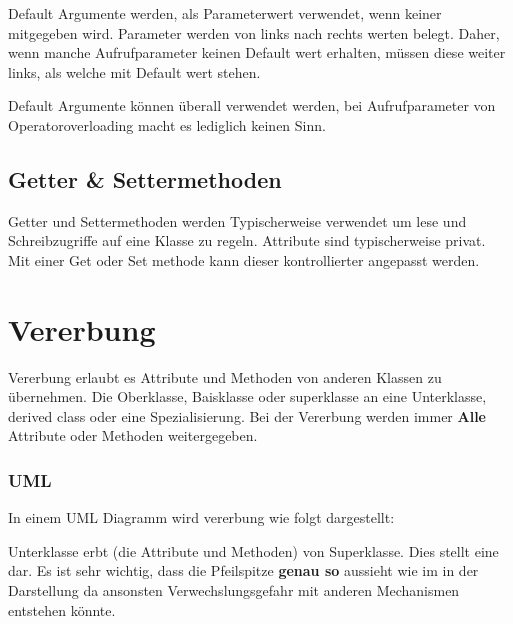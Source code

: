 Default Argumente werden, als Parameterwert verwendet, wenn keiner mitgegeben wird.
Parameter werden von links nach rechts werten belegt. 
Daher, wenn manche Aufrufparameter keinen Default wert erhalten, müssen diese weiter links, als welche mit Default wert stehen.  



Default Argumente können überall verwendet werden, bei Aufrufparameter von Operatoroverloading macht es lediglich keinen Sinn.

\subsection{Getter \& Settermethoden}

Getter und Settermethoden werden Typischerweise verwendet um lese und Schreibzugriffe auf eine Klasse zu regeln. 
Attribute sind typischerweise privat. 
Mit einer Get oder Set methode kann dieser kontrollierter angepasst  werden.\\



\section{Vererbung}

Vererbung erlaubt es Attribute und Methoden von anderen Klassen zu übernehmen. 
Die Oberklasse, Baisklasse oder superklasse  an eine Unterklasse, derived class oder eine Spezialisierung. 
Bei der Vererbung werden immer \textbf{Alle} Attribute oder Methoden weitergegeben.  


\subsubsection{UML}

In einem UML Diagramm wird vererbung wie folgt dargestellt:\\

\begin{center}
\end{center}


Unterklasse erbt (die Attribute und Methoden) von Superklasse. 
Dies stellt eine  dar. 
Es ist sehr wichtig, dass die Pfeilspitze \textbf{genau so} aussieht wie im in der Darstellung da ansonsten Verwechslungsgefahr mit anderen Mechanismen entstehen könnte.

